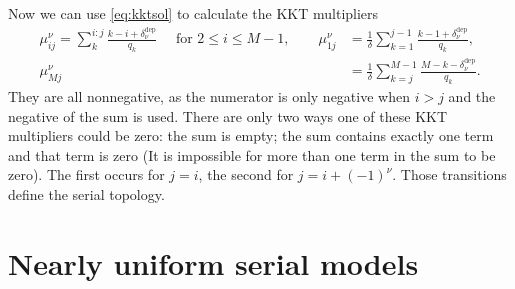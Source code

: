 \documentclass[12pt]{article}
\newcommand{\kktm}{\mu}
\newcommand{\dep}{^{\text{dep}}}
\begin{document}
%
Now we can use \cref{eq:kktsol} to calculate the KKT multipliers
%
\begin{equation}\label{eq:areaKKT}
\begin{aligned}
    \kktm^\nu_{ij} = \sum_k^{i:j} \frac{k - i + \delta\dep_\nu}{q_k}
      \quad \text{ for } 2 \leq i \leq M-1, \qquad
    \kktm^\nu_{1j} &= \frac{1}{\delta} \sum_{k=1}^{j-1} \frac{k - 1 + \delta\dep_\nu}{q_k},
      \\
    \kktm^\nu_{Mj} &= \frac{1}{\delta} \sum_{k=j}^{M-1} \frac{M - k - \delta\dep_\nu}{q_k}.
\end{aligned}
\end{equation}
%
They are all nonnegative, as the numerator is only negative when \(i > j\) and the negative of the sum is used.
There are only two ways one of these KKT multipliers could be zero: 
the sum is empty; 
the sum contains exactly one term and that term is zero
(It is impossible for more than one term in the sum to be zero).
The first occurs for \(j = i\), the second for \( j = i + (-1)^\nu \).
Those transitions define the serial topology.




\section{Nearly uniform serial models}\label{sec:serial}
\end{document}
